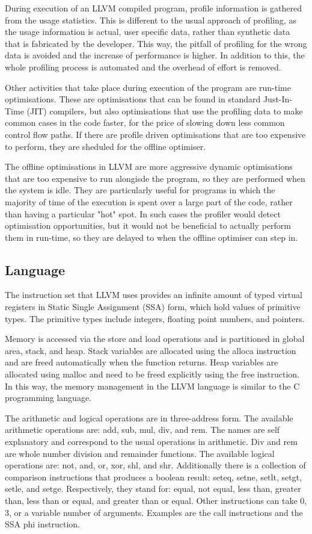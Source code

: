 \documentclass[parskip]{cs4rep}
\begin{document}
During execution of an LLVM compiled program, profile information is gathered from the usage statistics. This is different to the usual approach of profiling, as the usage information is actual, user specific data, rather than synthetic data that is fabricated by the developer. This way, the pitfall of profiling for the wrong data is avoided and the increase of performance is higher. In addition to this, the whole profiling process is automated and the overhead of effort is removed. 

Other activities that take place during execution of the program are run-time optimisations. These are optimisations that can be found in standard Just-In-Time (JIT) compilers, but also optimisations that use the profiling data to make common cases in the code faster, for the price of slowing down less common control flow paths. If there are profile driven optimisations that are too expensive to perform, they are sheduled for the offline optimiser.

The offline optimisations in LLVM are more aggressive dynamic optimisations that are too expensive to run alongisde the program, so they are performed when the system is idle. They are particularly useful for programs in which the majority of time of the execution is spent over a large part of the code, rather than having a particular "hot" spot. In such cases the profiler would detect optimisation opportunities, but it would not be beneficial to actually perform them in run-time, so they are delayed to when the offline optimiser can step in.

\subsection{Language}

The instruction set that LLVM uses provides an infinite amount of typed virtual registers in Static Single Assignment (SSA) form, which hold values of primitive types. The primitive types include integers, floating point numbers, and pointers. 

Memory is accessed via the store and load operations and is partitioned in global area, stack, and heap. Stack variables are allocated using the alloca instruction and are freed automatically when the function returns. Heap variables are allocated using malloc and need to be freed explicitly using the free instruction. In this way, the memory management in the LLVM language is similar to the C programming language.

The arithmetic and logical operations are in three-address form. The available arithmetic operations are: add, sub, mul, div, and rem. The names are self explanatory and correspond to the usual operations in arithmetic. Div and rem are whole number division and remainder functions. The available logical operations are: not, and, or, xor, shl, and shr. Additionally there is a collection of comparison instructions that produces a boolean result: seteq, setne, setlt, setgt, setle, and setge. Respectively, they stand for: equal, not equal, less than, greater than, less than or equal, and greater than or equal. Other instructions can take 0, 3, or a variable number of arguments. Examples are the call instructions and the SSA phi instruction.
\end{document}
